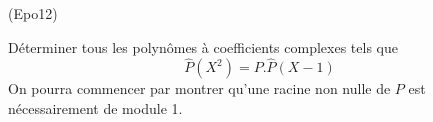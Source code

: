 \begin{tiny}(Epo12)\end{tiny} D{\'e}terminer tous les polyn{\^o}mes {\`a} coefficients complexes
tels que
\[
\widehat{P}(X^{2})=P.\widehat{P}(X-1)
\]
On pourra commencer par montrer qu'une racine non nulle de $P$ est
n{\'e}cessairement de module 1.
